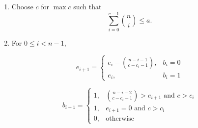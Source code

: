 \documentclass[a4paper,12pt]{article}
\begin{document}
\begin{enumerate}

\item Choose $c$ for $\max c$ such that
\begin{equation}
    \sum\limits_{i=0}^{c-1}\binom{n}{i}\leq a.
\end{equation}

\item For $0 \leq i < n - 1$,

\begin{equation}
    e_{i+1}=\begin{cases}
        e_i - \binom{n-i-1}{c-c_i-1}, & b_i=0 \\
        e_i, & b_i=1
    \end{cases}
\end{equation}

\begin{equation}
    b_{i+1}=\begin{cases}
        1, & \binom{n-i-2}{c-c_i-1} > e_{i+1} \text{ and } c > c_i \\
        1, & e_{i+1}=0 \text{ and } c > c_i \\
        0, & \text{otherwise}
    \end{cases}
\end{equation}

\end{enumerate}
\end{document}
